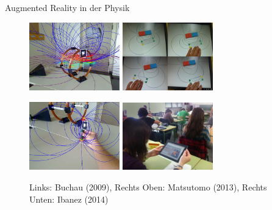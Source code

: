 \begin{frame}[fragile]{Augmented Reality in der Physik}

\begin{figure}
	\includegraphics[width=0.35\textwidth]{images/papers/Buchau09.jpg}
	\hspace{0.05cm}
	\includegraphics[width=0.35\textwidth]{images/papers/Matsutomo13.jpg}

	\includegraphics[width=0.35\textwidth]{images/papers/Buchau09_Magnet.jpg}
	\hspace{0.05cm}
	\includegraphics[width=0.35\textwidth]{images/papers/Ibanez14.jpg}

	\setlength{\abovecaptionskip}{5pt plus 5pt minus 2pt}
	\caption*{Links: Buchau (2009), Rechts Oben: Matsutomo (2013), Rechts Unten: Ibanez (2014)}
\end{figure}
\end{frame}

